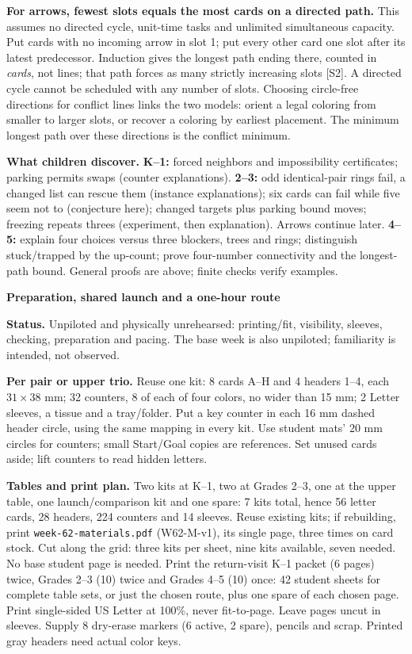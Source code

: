 \documentclass[10pt]{article}
\newcommand{\head}[1]{\par{\large\bfseries #1}\par}
\newcommand{\word}[1]{\texttt{#1}}
\begin{document}
\textbf{For arrows, fewest slots equals the most cards on a directed path.} This assumes no directed cycle, unit-time tasks and unlimited simultaneous capacity. Put cards with no incoming arrow in slot 1; put every other card one slot after its latest predecessor. Induction gives the longest path ending there, counted in \emph{cards}, not lines; that path forces as many strictly increasing slots [S2]. A directed cycle cannot be scheduled with any number of slots. Choosing circle-free directions for conflict lines links the two models: orient a legal coloring from smaller to larger slots, or recover a coloring by earliest placement. The minimum longest path over these directions is the conflict minimum.

\textbf{What children discover.} \textbf{K--1:} forced neighbors and impossibility certificates; parking permits swaps (counter explanations). \textbf{2--3:} odd identical-pair rings fail, a changed list can rescue them (instance explanations); six cards can fail while five seem not to (conjecture here); changed targets plus parking bound moves; freezing repeats threes (experiment, then explanation). Arrows continue later. \textbf{4--5:} explain four choices versus three blockers, trees and rings; distinguish stuck/trapped by the up-count; prove four-number connectivity and the longest-path bound. General proofs are above; finite checks verify examples.
\newpage
\head{Preparation, shared launch and a one-hour route}
\textbf{Status.} Unpiloted and physically unrehearsed: printing/fit, visibility, sleeves, checking, preparation and pacing. The base week is also unpiloted; familiarity is intended, not observed.

\textbf{Per pair or upper trio.} Reuse one kit: 8 cards A--H and 4 headers 1--4, each $31\times38$ mm; 32 counters, 8 of each of four colors, no wider than 15 mm; 2 Letter sleeves, a tissue and a tray/folder. Put a key counter in each 16 mm dashed header circle, using the same mapping in every kit. Use student mats' 20 mm circles for counters; small Start/Goal copies are references. Set unused cards aside; lift counters to read hidden letters.

\textbf{Tables and print plan.} Two kits at K--1, two at Grades 2--3, one at the upper table, one launch/comparison kit and one spare: 7 kits total, hence 56 letter cards, 28 headers, 224 counters and 14 sleeves. Reuse existing kits; if rebuilding, print \word{week-62-materials.pdf} (W62-M-v1), its single page, three times on card stock. Cut along the grid: three kits per sheet, nine kits available, seven needed. No base student page is needed. Print the return-visit K--1 packet (6 pages) twice, Grades 2--3 (10) twice and Grades 4--5 (10) once: 42 student sheets for complete table sets, or just the chosen route, plus one spare of each chosen page. Print single-sided US Letter at 100\%, never fit-to-page. Leave pages uncut in sleeves. Supply 8 dry-erase markers (6 active, 2 spare), pencils and scrap. Printed gray headers need actual color keys.
\end{document}
